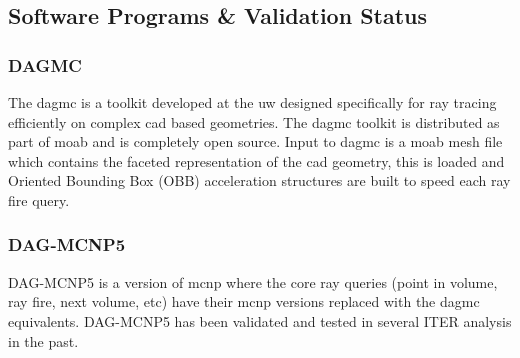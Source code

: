 \documentclass[12pt]{article}
\begin{document}
\subsection{Software Programs \& Validation Status}
\subsubsection{DAGMC}
The \gls{dagmc} is a toolkit developed at the \gls{uw}
designed specifically for ray tracing efficiently on complex \gls{cad} based
geometries. The \gls{dagmc} toolkit is distributed as part of \gls{moab} and
is completely open source. Input to \gls{dagmc} is a \gls{moab} mesh file
which contains the faceted representation of the \gls{cad} geometry, this
is loaded and Oriented Bounding Box (OBB) acceleration structures are built
to speed each ray fire query.
\subsubsection{DAG-MCNP5}
DAG-MCNP5 \cite{dagmc} is a version of \gls{mcnp} \cite{mcnp} where the core ray
queries (point in volume, ray fire, next volume, etc) have their \gls{mcnp}
versions replaced with the \gls{dagmc} equivalents. DAG-MCNP5 has been validated
\cite{dagmc_validation} and tested in several ITER analysis in the past.
\end{document}
